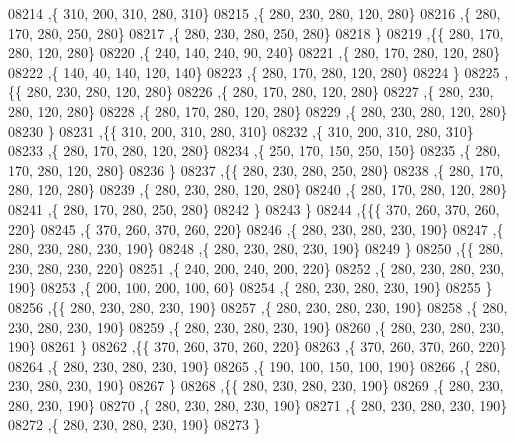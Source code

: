 \begin{DoxyCode}
08214     ,\{   310,   200,   310,   280,   310\}
08215     ,\{   280,   230,   280,   120,   280\}
08216     ,\{   280,   170,   280,   250,   280\}
08217     ,\{   280,   230,   280,   250,   280\}
08218     \}
08219    ,\{\{   280,   170,   280,   120,   280\}
08220     ,\{   240,   140,   240,    90,   240\}
08221     ,\{   280,   170,   280,   120,   280\}
08222     ,\{   140,    40,   140,   120,   140\}
08223     ,\{   280,   170,   280,   120,   280\}
08224     \}
08225    ,\{\{   280,   230,   280,   120,   280\}
08226     ,\{   280,   170,   280,   120,   280\}
08227     ,\{   280,   230,   280,   120,   280\}
08228     ,\{   280,   170,   280,   120,   280\}
08229     ,\{   280,   230,   280,   120,   280\}
08230     \}
08231    ,\{\{   310,   200,   310,   280,   310\}
08232     ,\{   310,   200,   310,   280,   310\}
08233     ,\{   280,   170,   280,   120,   280\}
08234     ,\{   250,   170,   150,   250,   150\}
08235     ,\{   280,   170,   280,   120,   280\}
08236     \}
08237    ,\{\{   280,   230,   280,   250,   280\}
08238     ,\{   280,   170,   280,   120,   280\}
08239     ,\{   280,   230,   280,   120,   280\}
08240     ,\{   280,   170,   280,   120,   280\}
08241     ,\{   280,   170,   280,   250,   280\}
08242     \}
08243    \}
08244   ,\{\{\{   370,   260,   370,   260,   220\}
08245     ,\{   370,   260,   370,   260,   220\}
08246     ,\{   280,   230,   280,   230,   190\}
08247     ,\{   280,   230,   280,   230,   190\}
08248     ,\{   280,   230,   280,   230,   190\}
08249     \}
08250    ,\{\{   280,   230,   280,   230,   220\}
08251     ,\{   240,   200,   240,   200,   220\}
08252     ,\{   280,   230,   280,   230,   190\}
08253     ,\{   200,   100,   200,   100,    60\}
08254     ,\{   280,   230,   280,   230,   190\}
08255     \}
08256    ,\{\{   280,   230,   280,   230,   190\}
08257     ,\{   280,   230,   280,   230,   190\}
08258     ,\{   280,   230,   280,   230,   190\}
08259     ,\{   280,   230,   280,   230,   190\}
08260     ,\{   280,   230,   280,   230,   190\}
08261     \}
08262    ,\{\{   370,   260,   370,   260,   220\}
08263     ,\{   370,   260,   370,   260,   220\}
08264     ,\{   280,   230,   280,   230,   190\}
08265     ,\{   190,   100,   150,   100,   190\}
08266     ,\{   280,   230,   280,   230,   190\}
08267     \}
08268    ,\{\{   280,   230,   280,   230,   190\}
08269     ,\{   280,   230,   280,   230,   190\}
08270     ,\{   280,   230,   280,   230,   190\}
08271     ,\{   280,   230,   280,   230,   190\}
08272     ,\{   280,   230,   280,   230,   190\}
08273     \}

\end{DoxyCode}
